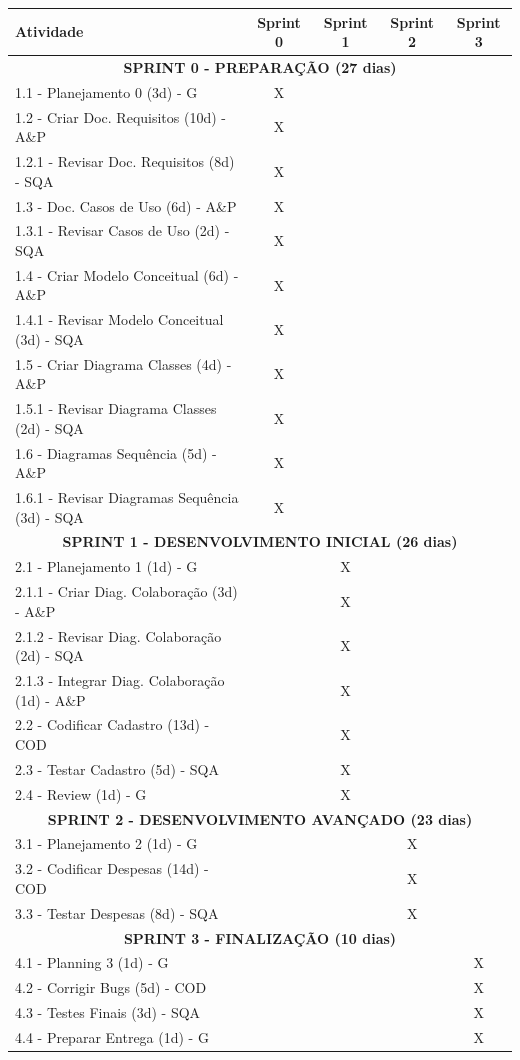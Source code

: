 \begin{longtable}{|p{6cm}|c|c|c|c|}
\hline
\textbf{Atividade} & \textbf{Sprint 0} & \textbf{Sprint 1} & \textbf{Sprint 2} & \textbf{Sprint 3} \\
\hline
\multicolumn{5}{|c|}{\textbf{SPRINT 0 - PREPARAÇÃO (27 dias)}} \\
\hline
1.1 - Planejamento 0 (3d) - G & X & & & \\
\hline
1.2 - Criar Doc. Requisitos (10d) - A\&P & X & & & \\
\hline
1.2.1 - Revisar Doc. Requisitos (8d) - SQA & X & & & \\
\hline
1.3 - Doc. Casos de Uso (6d) - A\&P & X & & & \\
\hline
1.3.1 - Revisar Casos de Uso (2d) - SQA & X & & & \\
\hline
1.4 - Criar Modelo Conceitual (6d) - A\&P & X & & & \\
\hline
1.4.1 - Revisar Modelo Conceitual (3d) - SQA & X & & & \\
\hline
1.5 - Criar Diagrama Classes (4d) - A\&P & X & & & \\
\hline
1.5.1 - Revisar Diagrama Classes (2d) - SQA & X & & & \\
\hline
1.6 - Diagramas Sequência (5d) - A\&P & X & & & \\
\hline
1.6.1 - Revisar Diagramas Sequência (3d) - SQA & X & & & \\
\hline
\multicolumn{5}{|c|}{\textbf{SPRINT 1 - DESENVOLVIMENTO INICIAL (26 dias)}} \\
\hline
2.1 - Planejamento 1 (1d) - G & & X & & \\
\hline
2.1.1 - Criar Diag. Colaboração (3d) - A\&P & & X & & \\
\hline
2.1.2 - Revisar Diag. Colaboração (2d) - SQA & & X & & \\
\hline
2.1.3 - Integrar Diag. Colaboração (1d) - A\&P & & X & & \\
\hline
2.2 - Codificar Cadastro (13d) - COD & & X & & \\
\hline
2.3 - Testar Cadastro (5d) - SQA & & X & & \\
\hline
2.4 - Review (1d) - G & & X & & \\
\hline
\multicolumn{5}{|c|}{\textbf{SPRINT 2 - DESENVOLVIMENTO AVANÇADO (23 dias)}} \\
\hline
3.1 - Planejamento 2 (1d) - G & & & X & \\
\hline
3.2 - Codificar Despesas (14d) - COD & & & X & \\
\hline
3.3 - Testar Despesas (8d) - SQA & & & X & \\
\hline
\multicolumn{5}{|c|}{\textbf{SPRINT 3 - FINALIZAÇÃO (10 dias)}} \\
\hline
4.1 - Planning 3 (1d) - G & & & & X \\
\hline
4.2 - Corrigir Bugs (5d) - COD & & & & X \\
\hline
4.3 - Testes Finais (3d) - SQA & & & & X \\
\hline
4.4 - Preparar Entrega (1d) - G & & & & X \\
\hline
\end{longtable}

